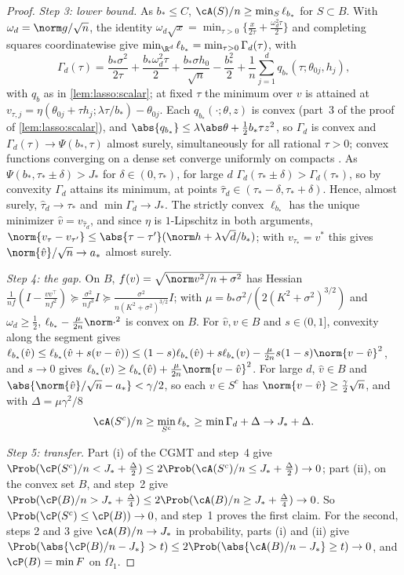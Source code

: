 \begin{refsection}
\begin{proof}
\emph{Step 3: lower bound.} As $b_*\le C$, $\cA(S)/n\ge\min_S\ell_{b_*}$ for $S\subset B$. With $\omega_d=\norm g/\sqrt n$, the identity $\omega_d\sqrt x=\min_{\tau>0}\{\frac x{2\tau}+\frac{\omega_d^2\tau}2\}$ and completing squares coordinatewise give $\min_{\R^d}\ell_{b_*}=\min_{\tau>0}\Gamma_d(\tau)$, with
\[
\Gamma_d(\tau)=\frac{b_*\sigma^2}{2\tau}+\frac{b_*\omega_d^2\tau}2+\frac{b_*\sigma h_0}{\sqrt n}-\frac{b_*^2}2+\frac1n\sum_{j=1}^dq_{b_*}(\tau;\theta_{0j},h_j),
\]
with $q_b$ as in \cref{lem:lasso:scalar}; at fixed $\tau$ the minimum over $v$ is attained at $v_{\tau,j}=\eta(\theta_{0j}+\tau h_j;\lambda\tau/b_*)-\theta_{0j}$. Each $q_{b_*}(\cdot;\theta,z)$ is convex (part~3 of the proof of \cref{lem:lasso:scalar}), and $\abs{q_{b_*}}\le\lambda\abs\theta+\frac12b_*\tau z^2$, so $\Gamma_d$ is convex and $\Gamma_d(\tau)\to\Psi(b_*,\tau)$ almost surely, simultaneously for all rational $\tau>0$; convex functions converging on a dense set converge uniformly on compacts \parencite[Theorem~10.8]{Rockafellar1970}. As $\Psi(b_*,\tau_*\pm\delta)>J_*$ for $\delta\in(0,\tau_*)$, for large $d$ $\Gamma_d(\tau_*\pm\delta)>\Gamma_d(\tau_*)$, so by convexity $\Gamma_d$ attains its minimum, at points $\hat\tau_d\in(\tau_*-\delta,\tau_*+\delta)$. Hence, almost surely, $\hat\tau_d\to\tau_*$ and $\min\Gamma_d\to J_*$. The strictly convex $\ell_{b_*}$ has the unique minimizer $\hat v=v_{\hat\tau_d}$, and since $\eta$ is $1$-Lipschitz in both arguments, $\norm{v_\tau-v_{\tau'}}\le\abs{\tau-\tau'}(\norm h+\lambda\sqrt d/b_*)$; with $v_{\tau_*}=v^*$ this gives $\norm{\hat v}/\sqrt n\to a_*$ almost surely.

\emph{Step 4: the gap.} On $B$, $f(v)=\sqrt{\norm v^2/n+\sigma^2}$ has Hessian $\frac1{nf}(I-\frac{vv^\top}{nf^2})\succeq\frac{\sigma^2}{nf^3}I\succeq\frac{\sigma^2}{n(K^2+\sigma^2)^{3/2}}I$; with $\mu=b_*\sigma^2/(2(K^2+\sigma^2)^{3/2})$ and $\omega_d\ge\frac12$, $\ell_{b_*}-\frac\mu{2n}\norm\cdot^2$ is convex on $B$. For $\hat v,v\in B$ and $s\in(0,1]$, convexity along the segment gives $\ell_{b_*}(\hat v)\le\ell_{b_*}(\hat v+s(v-\hat v))\le(1-s)\ell_{b_*}(\hat v)+s\ell_{b_*}(v)-\frac\mu{2n}s(1-s)\norm{v-\hat v}^2$, and $s\to0$ gives $\ell_{b_*}(v)\ge\ell_{b_*}(\hat v)+\frac\mu{2n}\norm{v-\hat v}^2$. For large $d$, $\hat v\in B$ and $\abs{\norm{\hat v}/\sqrt n-a_*}<\gamma/2$, so each $v\in S^c$ has $\norm{v-\hat v}\ge\frac\gamma2\sqrt n$, and with $\Delta=\mu\gamma^2/8$
\[
\cA(S^c)/n\ge\min_{S^c}\ell_{b_*}\ge\min\Gamma_d+\Delta\to J_*+\Delta.
\]

\emph{Step 5: transfer.} Part (i) of the CGMT and step~4 give $\Prob(\cP(S^c)/n<J_*+\frac\Delta2)\le2\Prob(\cA(S^c)/n\le J_*+\frac\Delta2)\to0$; part (ii), on the convex set $B$, and step~2 give $\Prob(\cP(B)/n>J_*+\frac\Delta4)\le2\Prob(\cA(B)/n\ge J_*+\frac\Delta4)\to0$. So $\Prob(\cP(S^c)\le\cP(B))\to0$, and step~1 proves the first claim. For the second, steps 2 and 3 give $\cA(B)/n\to J_*$ in probability, parts (i) and (ii) give $\Prob(\abs{\cP(B)/n-J_*}>t)\le2\Prob(\abs{\cA(B)/n-J_*}\ge t)\to0$, and $\cP(B)=\min F$ on $\Omega_1$.
\end{proof}


\end{refsection}
